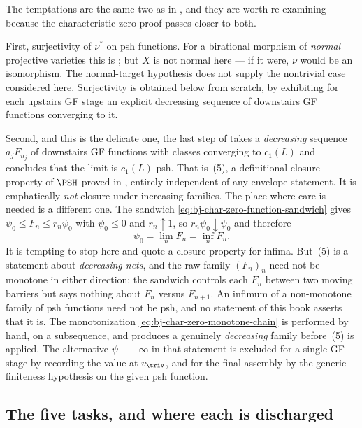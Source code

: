 \begin{remark}
\label{rem:ch44-firewall-not-vacuous}
The temptations are the same two as in
, and they are worth re-examining
because the characteristic-zero proof passes closer to both.

First, surjectivity of $\nu^*$ on psh functions.  For a birational
morphism of \emph{normal} projective varieties this is
; but $X$ is not normal here --- if it
were, $\nu$ would be an isomorphism.  The normal-target hypothesis
does not supply the nontrivial case considered here.  Surjectivity is obtained below
from scratch, by exhibiting for each upstairs GF stage an explicit
decreasing sequence of downstairs GF functions converging to it.

Second, and this is the delicate one, the last step of
 takes a \emph{decreasing} sequence
$a_jF_{n_j}$ of downstairs GF functions with classes converging to
$c_1(L)$ and concludes that the limit is $c_1(L)$-psh.  That is
\,(5), a definitional closure property of
$\PSH$ proved in , entirely independent of any
envelope statement.  It is emphatically \emph{not} closure under increasing
families.  The place where care is needed is a different one.  The sandwich
\eqref{eq:bj-char-zero-function-sandwich} gives
$\psi_0\le F_n\le r_n\psi_0$ with $\psi_0\le0$ and $r_n\uparrow1$, so
$r_n\psi_0\downarrow\psi_0$ and therefore
\[
 \psi_0=\lim_nF_n=\inf_nF_n .
\]
It is tempting to stop here and quote a closure property for infima.  But
\,(5) is a statement about \emph{decreasing
nets}, and the raw family $(F_n)_n$ need not be monotone in either direction:
the sandwich controls each $F_n$ between two moving barriers but says
nothing about $F_n$ versus $F_{n+1}$.  An infimum of a non-monotone
family of psh functions need not be psh, and no statement of this book
asserts that it is.  The monotonization
\eqref{eq:bj-char-zero-monotone-chain} is performed by hand, on a
subsequence, and produces a genuinely \emph{decreasing} family before
\,(5) is applied.  The alternative
$\psi\equiv-\infty$ in that statement is excluded for a single GF stage
by recording the value at $v_\triv$, and for the final assembly by the
generic-finiteness hypothesis on the given psh function.
\end{remark}

\subsection{The five tasks, and where each is discharged}
\label{sec:ch44-tasks}

